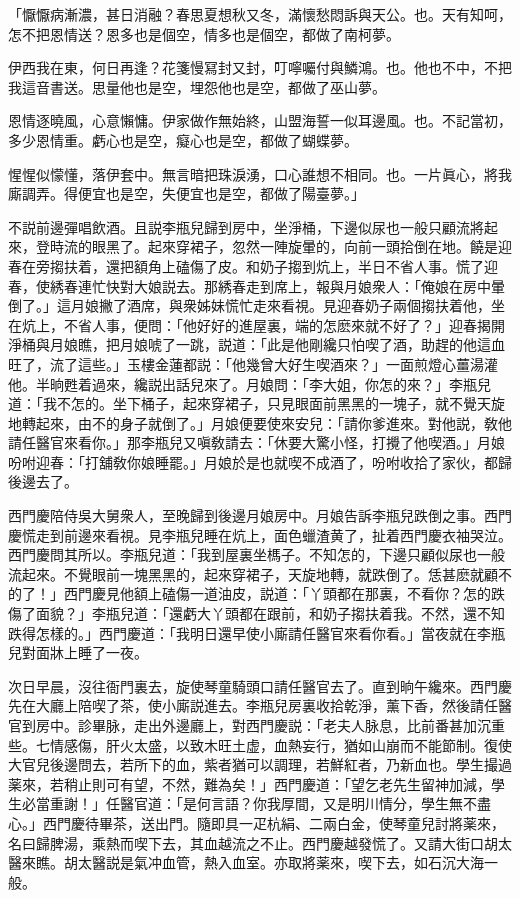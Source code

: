 \begin{myquote}
「懨懨病漸濃，甚日消融？春思夏想秋又冬，滿懷愁悶訴與天公。也。天有知呵，怎不把恩情送？恩多也是個空，情多也是個空，都做了南柯夢。

伊西我在東，何日再逢？花箋慢冩封又封，叮嚀囑付與鱗鴻。也。他也不中，不把我這音書送。思量他也是空，埋怨他也是空，都做了巫山夢。

恩情逐曉風，心意懶慵。伊家做作無始終，山盟海誓一似耳邊風。也。不記當初，多少恩情重。虧心也是空，癡心也是空，都做了蝴蝶夢。

惺惺似懞懂，落伊套中。無言暗把珠淚湧，口心誰想不相同。也。一片眞心，將我廝調弄。得便宜也是空，失便宜也是空，都做了陽臺夢。」
\end{myquote}

不説前邊彈唱飲酒。且説李瓶兒歸到房中，坐淨桶，下邊似尿也一般只顧流將起來，登時流的眼黑了。起來穿裙子，忽然一陣旋暈的，向前一頭拾倒在地。饒是迎春在旁搊扶着，還把額角上磕傷了皮。和奶子搊到炕上，半日不省人事。慌了迎春，使綉春連忙快對大娘説去。那綉春走到席上，報與月娘衆人：「俺娘在房中暈倒了。」這月娘撇了酒席，與衆姊妹慌忙走來看視。見迎春奶子兩個搊扶着他，坐在炕上，不省人事，便問：「他好好的進屋裏，端的怎麽來就不好了？」迎春揭開淨桶與月娘瞧，把月娘唬了一跳，説道：「此是他剛纔只怕喫了酒，助趕的他這血旺了，流了這些。」玉樓金蓮都説：「他幾曾大好生喫酒來？」一面煎燈心薑湯灌他。半晌甦着過來，纔説出話兒來了。月娘問：「李大姐，你怎的來？」李瓶兒道：「我不怎的。坐下桶子，起來穿裙子，只見眼面前黑黑的一塊子，就不覺天旋地轉起來，由不的身子就倒了。」月娘便要使來安兒：「請你爹進來。對他説，敎他請任醫官來看你。」那李瓶兒又嗔敎請去：「休要大驚小怪，打攪了他喫酒。」月娘吩咐迎春：「打舖敎你娘睡罷。」月娘於是也就喫不成酒了，吩咐收拾了家伙，都歸後邊去了。

西門慶陪侍吳大舅衆人，至晚歸到後邊月娘房中。月娘告訴李瓶兒跌倒之事。西門慶慌走到前邊來看視。見李瓶兒睡在炕上，面色蠟渣黄了，扯着西門慶衣袖哭泣。西門慶問其所以。李瓶兒道：「我到屋裏坐榪子。不知怎的，下邊只顧似尿也一般流起來。不覺眼前一塊黑黑的，起來穿裙子，天旋地轉，就跌倒了。恁甚麽就顧不的了！」西門慶見他額上磕傷一道油皮，説道：「丫頭都在那裏，不看你？怎的跌傷了面貌？」李瓶兒道：「還虧大丫頭都在跟前，和奶子搊扶着我。不然，還不知跌得怎樣的。」西門慶道：「我明日還早使小廝請任醫官來看你看。」當夜就在李瓶兒對面牀上睡了一夜。

次日早晨，沒往衙門裏去，旋使琴童騎頭口請任醫官去了。直到晌午纔來。西門慶先在大廳上陪喫了茶，使小廝説進去。李瓶兒房裏收拾乾淨，薰下香，然後請任醫官到房中。診畢脉，走出外邊廳上，對西門慶説：「老夫人脉息，比前番甚加沉重些。七情感傷，肝火太盛，以致木旺土虚，血熱妄行，猶如山崩而不能節制。復使大官兒後邊問去，若所下的血，紫者猶可以調理，若鮮紅者，乃新血也。學生撮過薬來，若稍止則可有望，不然，難為矣！」西門慶道：「望乞老先生留神加減，學生必當重謝！」任醫官道：「是何言語？你我厚間，又是明川情分，學生無不盡心。」西門慶待畢茶，送出門。隨即具一疋杭絹、二兩白金，使琴童兒討將薬來，名曰歸脾湯，乘熱而喫下去，其血越流之不止。西門慶越發慌了。又請大街口胡太醫來瞧。胡太醫説是氣冲血管，熱入血室。亦取將薬來，喫下去，如石沉大海一般。

